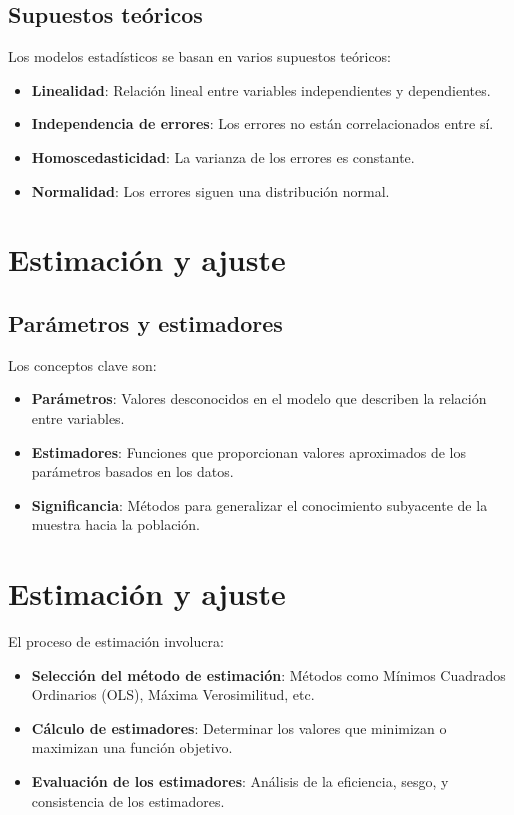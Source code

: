\documentclass[
  letterpaper,
  DIV=11,
  numbers=noendperiod]{scrreprt}
\providecommand{\tightlist}{%
  \setlength{\itemsep}{0pt}\setlength{\parskip}{0pt}}\usepackage{longtable,booktabs,array}
\begin{document}
\subsection{Supuestos teóricos}\label{supuestos-teuxf3ricos}

Los modelos estadísticos se basan en varios supuestos teóricos:

\begin{itemize}
\tightlist
\item
  \textbf{Linealidad}: Relación lineal entre variables independientes y
  dependientes.
\item
  \textbf{Independencia de errores}: Los errores no están
  correlacionados entre sí.
\item
  \textbf{Homoscedasticidad}: La varianza de los errores es constante.
\item
  \textbf{Normalidad}: Los errores siguen una distribución normal.
\end{itemize}

\section{Estimación y ajuste}\label{estimaciuxf3n-y-ajuste}

\subsection{Parámetros y estimadores}\label{paruxe1metros-y-estimadores}

Los conceptos clave son:

\begin{itemize}
\tightlist
\item
  \textbf{Parámetros}: Valores desconocidos en el modelo que describen
  la relación entre variables.
\item
  \textbf{Estimadores}: Funciones que proporcionan valores aproximados
  de los parámetros basados en los datos.
\item
  \textbf{Significancia}: Métodos para generalizar el conocimiento
  subyacente de la muestra hacia la población.
\end{itemize}

\section{Estimación y ajuste}\label{estimaciuxf3n-y-ajuste-1}

El proceso de estimación involucra:

\begin{itemize}
\tightlist
\item
  \textbf{Selección del método de estimación}: Métodos como Mínimos
  Cuadrados Ordinarios (OLS), Máxima Verosimilitud, etc.
\item
  \textbf{Cálculo de estimadores}: Determinar los valores que minimizan
  o maximizan una función objetivo.
\item
  \textbf{Evaluación de los estimadores}: Análisis de la eficiencia,
  sesgo, y consistencia de los estimadores.
\end{itemize}
\end{document}
